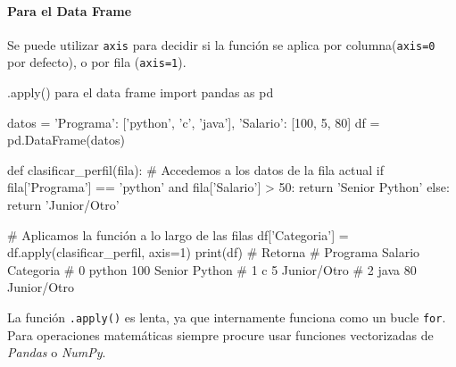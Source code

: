 \paragraph{Para el Data Frame}
Se puede utilizar \texttt{axis} para decidir si la función se aplica por columna(\texttt{axis=0} por defecto), o por fila (\texttt{axis=1}).

\begin{pycode}{.apply() para el data frame}
import pandas as pd

datos = {
    'Programa': ['python', 'c', 'java'],
    'Salario': [100, 5, 80]
}
df = pd.DataFrame(datos)

def clasificar_perfil(fila):
    # Accedemos a los datos de la fila actual
    if fila['Programa'] == 'python' and fila['Salario'] > 50:
        return 'Senior Python'
    else:
        return 'Junior/Otro'

# Aplicamos la función a lo largo de las filas
df['Categoria'] = df.apply(clasificar_perfil, axis=1)
print(df) # Retorna
#   Programa  Salario      Categoria
# 0   python      100  Senior Python
# 1        c        5    Junior/Otro
# 2     java       80    Junior/Otro
\end{pycode}

\begin{nota}
    La función \texttt{.apply()} es lenta, ya que internamente funciona como un bucle \texttt{for}. Para operaciones matemáticas siempre procure usar funciones vectorizadas de \textit{Pandas} o \textit{NumPy}.
\end{nota}
